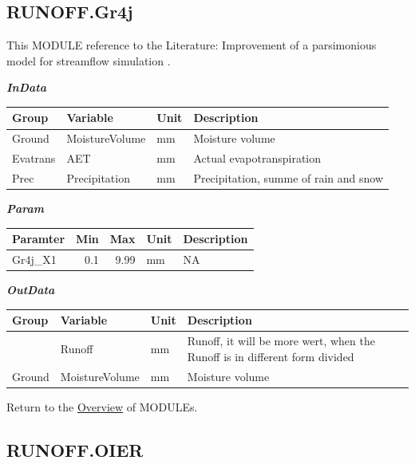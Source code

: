 \documentclass[
]{book}
\begin{document}
\hypertarget{RUNOFF.Gr4j}{%
\subsection{RUNOFF.Gr4j}\label{RUNOFF.Gr4j}}

This MODULE reference to the Literature: Improvement of a parsimonious model for streamflow simulation \citep{Perrin.2003}.

\textbf{\emph{InData}}

\begin{table}[!h]
\centering
\begin{tabular}{l|l|l|l}
\hline
Group & Variable & Unit & Description\\
\hline
Ground & MoistureVolume & mm & Moisture volume\\
\cline{1-4}
Evatrans & AET & mm & Actual evapotranspiration\\
\cline{1-4}
Prec & Precipitation & mm & Precipitation, summe of rain and snow\\
\hline
\end{tabular}
\end{table}

\textbf{\emph{Param}}

\begin{table}[!h]
\centering
\begin{tabular}{l|r|r|l|l}
\hline
Paramter & Min & Max & Unit & Description\\
\hline
Gr4j\_X1 & 0.1 & 9.99 & mm & NA\\
\hline
\end{tabular}
\end{table}

\textbf{\emph{OutData}}

\begin{table}[!h]
\centering
\begin{tabular}{l|l|l|l}
\hline
Group & Variable & Unit & Description\\
\hline
 & Runoff & mm & Runoff, it will be more wert, when the Runoff is in different form divided\\
\cline{2-4}
\multirow{-2}{*}{\raggedright\arraybackslash Ground} & MoistureVolume & mm & Moisture volume\\
\hline
\end{tabular}
\end{table}

Return to the \protect\hyperlink{module}{Overview} of MODULEs.

\hypertarget{RUNOFF.OIER}{%
\subsection{RUNOFF.OIER}\label{RUNOFF.OIER}}
\end{document}

